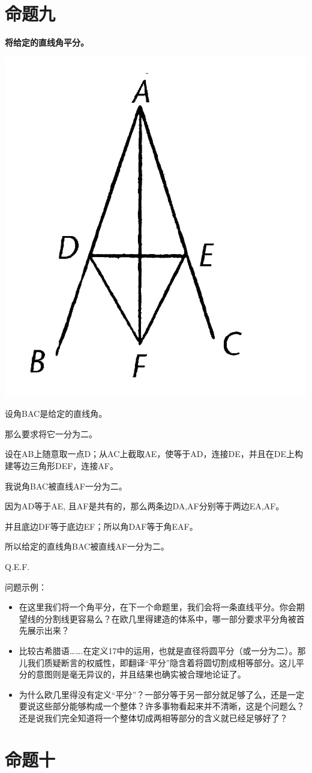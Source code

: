\documentclass[
]{book}
\providecommand{\tightlist}{%
  \setlength{\itemsep}{0pt}\setlength{\parskip}{0pt}}
\begin{document}
\hypertarget{ux547dux9898ux4e5d}{%
\section{命题九}\label{ux547dux9898ux4e5d}}

\textbf{将给定的直线角平分。}

\includegraphics[width=0.3\linewidth]{./image/img467}

设角BAC是给定的直线角。

那么要求将它一分为二。

设在AB上随意取一点D；从AC上截取AE，使等于AD，连接DE，并且在DE上构建等边三角形DEF，连接AF。

我说角BAC被直线AF一分为二。

因为AD等于AE, 且AF是共有的，那么两条边DA,AF分别等于两边EA,AF。

并且底边DF等于底边EF；所以角DAF等于角EAF。

所以给定的直线角BAC被直线AF一分为二。

Q.E.F.

问题示例：

\begin{itemize}
\tightlist
\item
  在这里我们将一个角平分，在下一个命题里，我们会将一条直线平分。你会期望线的分割线更容易么？在欧几里得建造的体系中，哪一部分要求平分角被首先展示出来？
\item
  比较古希腊语\ldots\ldots.在定义17中的运用，也就是直径将圆平分（或一分为二）。那儿我们质疑断言的权威性，即翻译``平分''隐含着将圆切割成相等部分。这儿平分的意图则是毫无异议的，并且结果也确实被合理地论证了。
\item
  为什么欧几里得没有定义``平分''？一部分等于另一部分就足够了么，还是一定要说这些部分能够构成一个整体？许多事物看起来并不清晰，这是个问题么？还是说我们完全知道将一个整体切成两相等部分的含义就已经足够好了？
\end{itemize}

\hypertarget{ux547dux9898ux5341}{%
\section{命题十}\label{ux547dux9898ux5341}}
\end{document}
